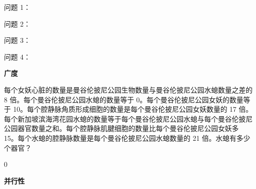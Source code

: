 


\begin{userprompt}[title={答案}]
问题 1：

问题 2：

问题 3：

问题 4：
\end{userprompt}



\textbf{广度}


\begin{systemprompt}[title={问题}]
每个女妖心脏的数量是曼谷伦披尼公园生物数量与曼谷伦披尼公园水螅数量之差的 8 倍。每个曼谷伦披尼公园水螅的数量等于 0。每个曼谷伦披尼公园女妖的数量等于 10。每个腔静脉角质形成细胞的数量是每个曼谷伦披尼公园女妖数量的 17 倍。每个新加坡滨海湾花园水螅的数量等于每个曼谷伦披尼公园水螅与每个曼谷伦披尼公园器官数量之和。每个腔静脉肌腱细胞的数量比每个曼谷伦披尼公园女妖多 15。每个水螅的腔静脉数量是每个曼谷伦披尼公园水螅数量的 21 倍。水螅有多少个器官？
 \end{systemprompt}
\begin{userprompt}[title={答案}]
0
\end{userprompt}


\textbf{并行性}


